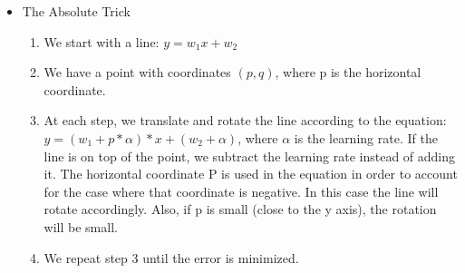 \documentclass{article}
\begin{document}
\begin{itemize}
  \item The Absolute Trick
  \begin{enumerate}
    \item We start with a line: $y = w_1 x + w_2$
    \item We have a point with coordinates $(p, q)$, where p is the horizontal coordinate.
    \item At each step, we translate and rotate the line according to the equation: $y = (w_1 + p * \alpha) * x + (w_2 + \alpha)$, where $\alpha$ is the learning rate. If the line is on top of the point, we subtract the learning rate instead of adding it. The horizontal coordinate P is used in the equation in order to account for the case where that coordinate is negative. In this case the line will rotate accordingly. Also, if p is small (close to the y axis), the rotation will be small.
    \item We repeat step 3 until the error is minimized.
  \end{enumerate}
\end{itemize}
\end{document}
